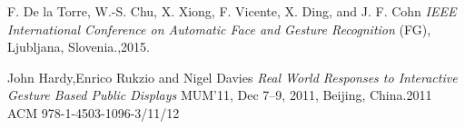 \begin{thebibliography}{9}
F. De la Torre, W.-S. Chu, X. Xiong, F. Vicente, X. Ding, and J. F. Cohn
\emph{IEEE International Conference on Automatic Face and Gesture Recognition}
(FG), Ljubljana, Slovenia.,2015. 


John Hardy,Enrico Rukzio and Nigel Davies
\emph{Real World Responses to Interactive Gesture Based Public Displays}
MUM’11, Dec 7–9, 2011, Beijing, China.2011 ACM 978-1-4503-1096-3/11/12
























\end{thebibliography}